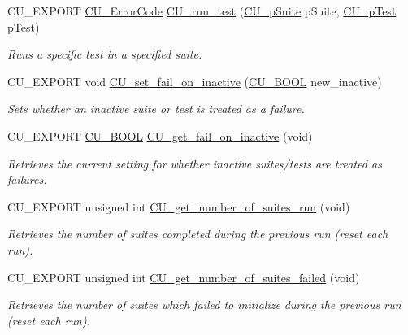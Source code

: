 \begin{DoxyCompactItemize}
C\-U\-\_\-\-E\-X\-P\-O\-R\-T \hyperlink{group__Framework_ga743a2a025ee3eb792d7d85f0eea347e6}{C\-U\-\_\-\-Error\-Code} \hyperlink{group__Framework_ga4469c032ef93be8169d4869b22ceabd1}{C\-U\-\_\-run\-\_\-test} (\hyperlink{group__Framework_gaba832ae8b235f5e70d6a4ac9c3bb1219}{C\-U\-\_\-p\-Suite} p\-Suite, \hyperlink{group__Framework_ga249c43fbe4e53452b3f90db1437da04b}{C\-U\-\_\-p\-Test} p\-Test)
\begin{DoxyCompactList}\small\item\em Runs a specific test in a specified suite. \end{DoxyCompactList}\item 
C\-U\-\_\-\-E\-X\-P\-O\-R\-T void \hyperlink{group__Framework_ga39e01a31e7e84844f7cf5377d5cd8da2}{C\-U\-\_\-set\-\_\-fail\-\_\-on\-\_\-inactive} (\hyperlink{group__Framework_gabd98d449e979a6379b06551242106dd4}{C\-U\-\_\-\-B\-O\-O\-L} new\-\_\-inactive)
\begin{DoxyCompactList}\small\item\em Sets whether an inactive suite or test is treated as a failure. \end{DoxyCompactList}\item 
C\-U\-\_\-\-E\-X\-P\-O\-R\-T \hyperlink{group__Framework_gabd98d449e979a6379b06551242106dd4}{C\-U\-\_\-\-B\-O\-O\-L} \hyperlink{group__Framework_gad1d61d7275df876f7bb90413e21f3757}{C\-U\-\_\-get\-\_\-fail\-\_\-on\-\_\-inactive} (void)
\begin{DoxyCompactList}\small\item\em Retrieves the current setting for whether inactive suites/tests are treated as failures. \end{DoxyCompactList}\item 
C\-U\-\_\-\-E\-X\-P\-O\-R\-T unsigned int \hyperlink{group__Framework_gaab6fa276971a06883668eb2c4f1e99d0}{C\-U\-\_\-get\-\_\-number\-\_\-of\-\_\-suites\-\_\-run} (void)
\begin{DoxyCompactList}\small\item\em Retrieves the number of suites completed during the previous run (reset each run). \end{DoxyCompactList}\item 
C\-U\-\_\-\-E\-X\-P\-O\-R\-T unsigned int \hyperlink{group__Framework_ga1bfdd516a754e0f914b0138746b645a4}{C\-U\-\_\-get\-\_\-number\-\_\-of\-\_\-suites\-\_\-failed} (void)
\begin{DoxyCompactList}\small\item\em Retrieves the number of suites which failed to initialize during the previous run (reset each run). \end{DoxyCompactList}\item 

\end{DoxyCompactItemize}
